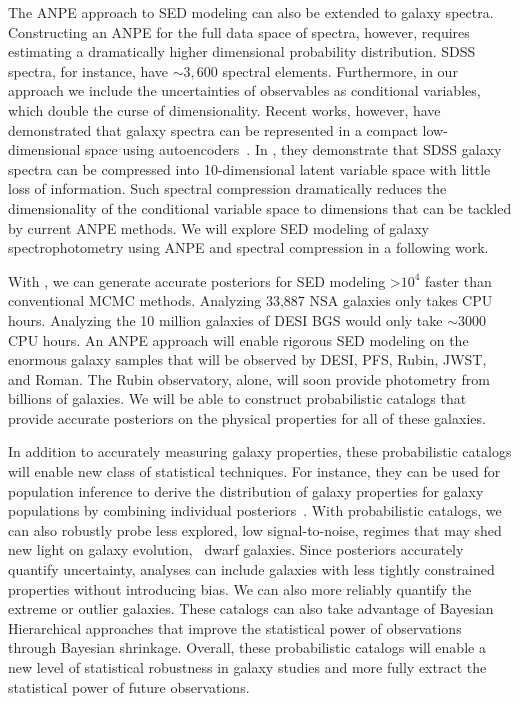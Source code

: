 The ANPE approach to SED modeling can also be extended to galaxy spectra. 
Constructing an ANPE for the full data space of spectra, however, requires
estimating a dramatically higher dimensional probability distribution. 
SDSS spectra, for instance, have ${\sim}3,600$ spectral elements.  
Furthermore, in our approach we include the uncertainties of observables as
conditional variables, which double the curse of dimensionality.
Recent works, however, have demonstrated that galaxy spectra can be represented
in a compact low-dimensional space using autoencoders~\citep[][; Melchior \&
Hahn in prep.]{portillo2020}.
In \cite{portillo2020}, they demonstrate that SDSS galaxy spectra can be
compressed into 10-dimensional latent variable space with little loss of
information. 
Such spectral compression dramatically reduces the dimensionality of the
conditional variable space to dimensions that can be tackled by current ANPE
methods. 
We will explore SED modeling of galaxy spectrophotometry using ANPE and
spectral compression in a following work. 

With \sedflow, we can generate accurate posteriors for SED modeling >$10^4$
faster than conventional MCMC methods. 
Analyzing 33,887 NSA galaxies only takes  CPU hours.
Analyzing the 10 million galaxies of DESI BGS would only take ${\sim}3000$ CPU
hours.
An ANPE approach will enable rigorous SED modeling on the enormous galaxy
samples that will be observed by DESI, PFS, Rubin, JWST, and Roman. 
The Rubin observatory, alone, will soon provide photometry from billions of
galaxies. 
We will be able to construct probabilistic catalogs that provide accurate
posteriors on the physical properties for all of these galaxies. 

In addition to accurately measuring galaxy properties, these probabilistic
catalogs will enable new class of statistical techniques.
For instance, they can be used for population inference to derive the
distribution of galaxy properties for galaxy populations by combining
individual posteriors~\citep[\eg][]{leja2019a}.
With probabilistic catalogs, we can also robustly probe less explored, low
signal-to-noise, regimes that may shed new light on galaxy evolution, 
\eg~dwarf galaxies.
Since posteriors accurately quantify uncertainty, analyses can include galaxies
with less tightly constrained properties without introducing bias. 
We can also more reliably quantify the extreme or outlier galaxies.
These catalogs can also take advantage of Bayesian Hierarchical approaches that
improve the statistical power of observations through Bayesian shrinkage. 
Overall, these probabilistic catalogs will enable a new level of statistical
robustness in galaxy studies and more fully extract the statistical power of
future observations. 
